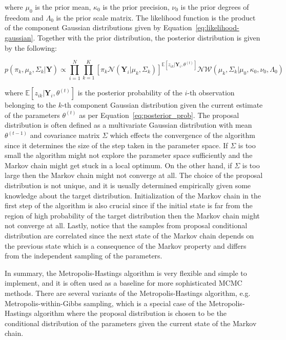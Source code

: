 where $\mu_0$ is the prior mean, $\kappa_0$ is the prior precision, $\nu_0$ is the prior degrees of freedom and $\Lambda_0$ is the prior scale matrix.
The likelihood function is the product of the component Gaussian distributions given by Equation~\ref{eq:likelihood-gaussian}. Together with the prior distribution, the posterior distribution is given by the following:

\begin{equation}
    p(\pi_k,\mu_k,\Sigma_k|\textbf{Y}) \propto \prod_{i=1}^{N} \prod_{k=1}^{K} {\left[ \pi_k \mathcal{N}(\textbf{Y}_i|\mu_k,\Sigma_k) \right]}^{\mathbb{E}[z_{ik}|\textbf{Y}_i,\theta^{(t)}]} \mathcal{NW}(\mu_k,\Sigma_k|\mu_0,\kappa_0,\nu_0,\Lambda_0)
\end{equation}

where $\mathbb{E}[z_{ik}|\textbf{Y}_i,\theta^{(t)}]$ is the posterior probability of the $i$-th observation belonging to the $k$-th component Gaussian distribution given the current estimate of the parameters $\theta^{(t)}$ as per Equation~\ref{eq:posterior_prob}.
The proposal distribution is often defined as a multivariate Gaussian distribution with mean $\theta^{(t-1)}$ and covariance matrix $\Sigma$ which effects the convergence of the algorithm since it determines the size of the step taken in the parameter space. 
If $\Sigma$ is too small the algorithm might not explore the parameter space sufficiently and the Markov chain might get stuck in a local optimum. On the other hand, if $\Sigma$ is too large then the Markov chain might not converge at all. 
The choice of the proposal distribution is not unique, and it is usually determined empirically given some knowledge about the target distribution. 
Initialization of the Markov chain in the first step of the algorithm is also crucial since if the initial state is far from the region of high probability of the target distribution then the Markov chain might not converge at all.
Lastly, notice that the samples from proposal conditional distribution are correlated since the next state of the Markov chain depends on the previous state which is a consequence of the Markov property and differs from the independent sampling of the parameters.

In summary, the Metropolis-Hastings algorithm is very flexible and simple to implement, and it is often used as a baseline for more sophisticated MCMC methods. 
There are several variants of the Metropolis-Hastings algorithm, e.g. Metropolis-within-Gibbs sampling, which is a special case of the Metropolis-Hastings algorithm where the proposal distribution is chosen to be the conditional distribution of the parameters given the current state of the Markov chain.

